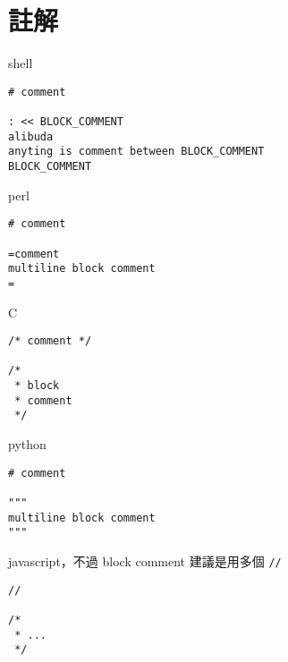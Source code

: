 \section{註解}
shell
\begin{verbatim}
# comment

: << BLOCK_COMMENT
alibuda
anyting is comment between BLOCK_COMMENT
BLOCK_COMMENT

\end{verbatim}
perl
\begin{verbatim}
# comment

=comment
multiline block comment
=
\end{verbatim}
C
\begin{verbatim}
/* comment */

/*
 * block
 * comment
 */

\end{verbatim}
python
\begin{verbatim}
# comment

"""
multiline block comment
"""
\end{verbatim}
javascript，不過 block comment 建議是用多個 \verb=//=
\begin{verbatim}
//

/*
 * ...
 */
\end{verbatim}


